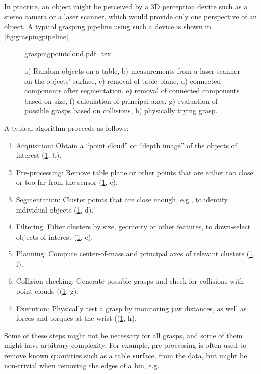 In practice, an object might be perceived by a 3D perception device such as a stereo camera or a laser scanner, which would provide only one perspective of an object. A typical grasping pipeline using such a device is shown in \cref{fig:graspingpipeline}.

\begin{figure}
    \def\svgwidth{\textwidth}
    {graspingpointcloud.pdf_tex}
    \caption{a) Random objects on a table, b) measurements from a laser scanner on the objects' surface, c) removal of table plane, d) connected components after segmentation, e) removal of connected components based on size, f) calculation of principal axes, g) evaluation of possible grasps based on collisions, h) physically trying grasp.\label{fig:graspalgorithm}}
\end{figure}

A typical algorithm proceeds as follows:
\begin{enumerate}
\item Acquisition: Obtain a ``point cloud'' or ``depth image'' of the objects of interest (\cref{fig:graspalgorithm}, b).
\item Pre-processing: Remove table plane or other points that are either too close or too far from the sensor (\cref{fig:graspalgorithm}, c).
\item Segmentation: Cluster points that are close enough, e.g., to identify individual objects (\cref{fig:graspalgorithm}, d).
\item Filtering: Filter clusters by size, geometry or other features, to down-select objects of interest (\cref{fig:graspalgorithm}, e).
\item Planning: Compute center-of-mass and principal axes of relevant clusters (\cref{fig:graspalgorithm}, f).
\item Collision-checking: Generate possible grasps and check for collisions with point clouds ((\cref{fig:graspalgorithm}, g).
\item Execution: Physically test a grasp by monitoring jaw distances, as well as forces and torques at the wrist ((\cref{fig:graspalgorithm}, h).
\end{enumerate}

Some of these steps might not be necessary for all grasps, and some of them might have arbitrary complexity. For example, pre-processing is often used to remove known quantities such as a table surface, from the data, but might be non-trivial when removing the edges of a bin, e.g.

